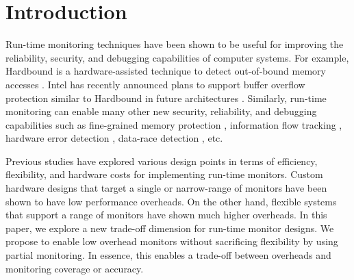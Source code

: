 \section{Introduction}
\label{sec:intro}

Run-time monitoring techniques have been shown to be useful for improving the
reliability, security, and debugging capabilities of computer systems. For
example, Hardbound is a hardware-assisted technique to detect out-of-bound
memory accesses \cite{hardbound-asplos08}.  Intel has
recently announced plans to support buffer overflow protection similar to
Hardbound in future architectures \cite{intel-mpx}. Similarly, run-time
monitoring can enable many other new security, reliability, and debugging
capabilities such as fine-grained memory protection \cite{mondrian-asplos02},
information flow tracking \cite{dift-asplos04, testudo-micro08}, hardware error
detection \cite{argus-micro07}, data-race detection \cite{radish-isca12,
cord-hpca06}, etc. 


Previous studies have explored various design points in terms of efficiency,
flexibility, and hardware costs for implementing run-time monitors. Custom
hardware designs that target a single or narrow-range of monitors have been
shown to have low performance overheads. On the other hand, flexible systems
that support a range of monitors have shown much higher overheads. In this
paper, we explore a new trade-off dimension for run-time monitor designs. We
propose to enable low overhead monitors without sacrificing flexibility by
using partial monitoring. In essence, this enables a trade-off between overheads and
monitoring coverage or accuracy.

